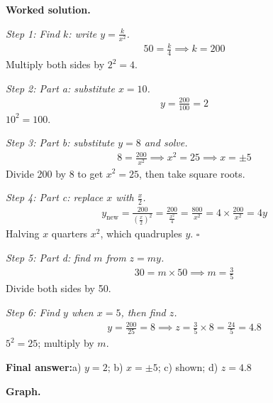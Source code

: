 \documentclass[11pt]{article}
\begin{document}
\textbf{Worked solution.}

\textit{Step 1: Find \( k \): write \( y = \frac{k}{x^2} \).}
\[\begin{gathered}
50 = \frac{k}{4} \implies k = 200
\end{gathered}\]
Multiply both sides by \( 2^2 = 4 \).

\textit{Step 2: Part a: substitute \( x = 10 \).}
\[\begin{gathered}
y = \frac{200}{100} = 2
\end{gathered}\]
\( 10^2 = 100 \).

\textit{Step 3: Part b: substitute \( y = 8 \) and solve.}
\[\begin{gathered}
8 = \frac{200}{x^2} \implies x^2 = 25 \implies x = \pm 5
\end{gathered}\]
Divide 200 by 8 to get \( x^2 = 25 \), then take square roots.

\textit{Step 4: Part c: replace \( x \) with \( \frac{x}{2} \).}
\[\begin{gathered}
y_{\text{new}} = \frac{200}{\left(\frac{x}{2}\right)^2} = \frac{200}{\frac{x^2}{4}} = \frac{800}{x^2} = 4 \times \frac{200}{x^2} = 4y
\end{gathered}\]
Halving \( x \) quarters \( x^2 \), which quadruples \( y \). \( \square \)

\textit{Step 5: Part d: find \( m \) from \( z = my \).}
\[\begin{gathered}
30 = m \times 50 \implies m = \frac{3}{5}
\end{gathered}\]
Divide both sides by 50.

\textit{Step 6: Find \( y \) when \( x = 5 \), then find \( z \).}
\[\begin{gathered}
y = \frac{200}{25} = 8 \implies z = \frac{3}{5} \times 8 = \frac{24}{5} = 4.8
\end{gathered}\]
\( 5^2 = 25 \); multiply by \( m \).

\begin{answerbox}
\textbf{Final answer:}\quad a) \(\displaystyle y = 2\); b) \(\displaystyle x = \pm 5\); c) shown; d) \(\displaystyle z = 4.8\)
\end{answerbox}
\textbf{Graph.}
\end{document}
